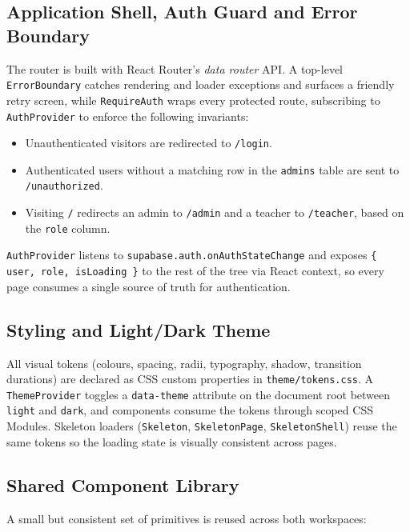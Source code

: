 \subsection{Application Shell, Auth Guard and Error Boundary}

The router is built with React Router's \emph{data router} API. A top-level \texttt{ErrorBoundary} catches rendering and loader exceptions and surfaces a friendly retry screen, while \texttt{RequireAuth} wraps every protected route, subscribing to \texttt{AuthProvider} to enforce the following invariants:

\begin{itemize}[leftmargin=2em]
  \item Unauthenticated visitors are redirected to \texttt{/login}.
  \item Authenticated users without a matching row in the \texttt{admins} table are sent to \texttt{/unauthorized}.
  \item Visiting \texttt{/} redirects an admin to \texttt{/admin} and a teacher to \texttt{/teacher}, based on the \texttt{role} column.
\end{itemize}

\texttt{AuthProvider} listens to \texttt{supabase.auth.onAuthStateChange} and exposes \texttt{\{ user, role, isLoading \}} to the rest of the tree via React context, so every page consumes a single source of truth for authentication.

\subsection{Styling and Light/Dark Theme}

All visual tokens (colours, spacing, radii, typography, shadow, transition durations) are declared as CSS custom properties in \texttt{theme/tokens.css}. A \texttt{ThemeProvider} toggles a \texttt{data-theme} attribute on the document root between \texttt{light} and \texttt{dark}, and components consume the tokens through scoped CSS Modules. Skeleton loaders (\texttt{Skeleton}, \texttt{SkeletonPage}, \texttt{SkeletonShell}) reuse the same tokens so the loading state is visually consistent across pages.

\subsection{Shared Component Library}

A small but consistent set of primitives is reused across both workspaces:

